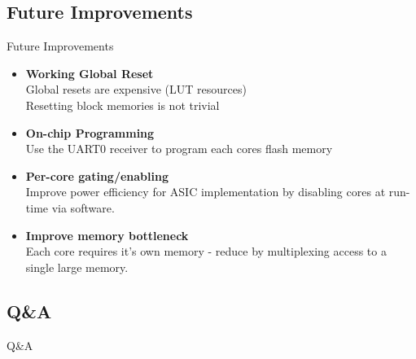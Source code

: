 \documentclass[aspectratio=169]{beamer}
\begin{document}
\subsection{Future Improvements}
\begin{frame}{Future Improvements}

\begin{itemize}
    \item \textbf{Working Global Reset}\\
    Global resets are expensive (LUT resources)\\
    Resetting block memories is not trivial
    
    \item \textbf{On-chip Programming}\\
    Use the UART0 receiver to program each cores flash memory
    
    \item \textbf{Per-core gating/enabling}\\
    Improve power efficiency for ASIC implementation by disabling cores at run-time via software.
    
    \item \textbf{Improve memory bottleneck}\\
    Each core requires it's own memory - reduce by multiplexing access to a single large memory.
\end{itemize}
\end{frame}

\subsection{Q\&A}
\begin{frame}[c]
\begin{center}
\Huge Q\&A
\end{center}

\end{frame}
\end{document}
